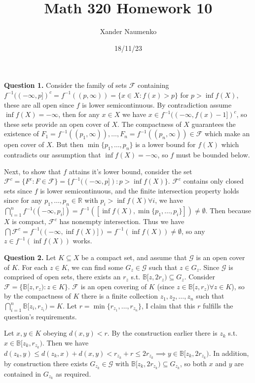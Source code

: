\documentclass[letterpaper, reqno,11pt]{article}
\begin{document}
\title{Math 320 Homework 10}
\date{18/11/23}
\author{Xander Naumenko}
\maketitle

{\medskip\noindent\bf Question 1.} Consider the family of sets $\mathcal F$ containing $f^{-1}((-\infty,p])^{c}=f^{-1}((p,\infty))=\{x\in X:f(x)>p\}$ for $p>\inf f(X)$, these are all open since $f$ is lower semicontinuous. By contradiction assume $\inf f(X)=-\infty$, then for any $x\in X$ we have $x\in f^{-1}((-\infty,f(x)-1])^{c}$, so these sets provide an open cover of $X$. The compactness of $X$ guarantees the existence of $F_1=f^{-1}((p_1,\infty)),\ldots,F_n=f^{-1}((p_n,\infty))\in \mathcal F$ which make an open cover of $X$. But then $\min \{p_1,\ldots,p_n\}$ is a lower bound for $f(X)$ which contradicts our assumption that $\inf f(X)=-\infty$, so $f$ must be bounded below.

Next, to show that $f$ attains it's lower bound, consider the set $\mathcal F^{c}=\{F^{c}:F\in \mathcal F\}=\{f^{-1}((-\infty,p]):p>\inf f(X)\}$. $\mathcal F^{c}$ contains only closed sets since $f$ is lower semicontinuous, and the finite intersection property holds since for any $p_1,\ldots,p_n\in \mathbb{R}$ with $p_i>\inf f(X)\forall i$, we have $\bigcap_{i=1}^{n}f^{-1}((-\infty,p_i])=f^{-1}([\inf f(X),\min \{p_1,\ldots,p_i\}])\neq \emptyset$. Then because $X$ is compact, $\mathcal F^{c}$ has nonempty intersection. Thus we have $\bigcap\mathcal F^{c}= f^{-1}((-\infty,\inf f(X)])=f^{-1}(\inf f(X))\neq \emptyset$, so any $z\in f^{-1}(\inf f(X))$ works.


\newpage\phantom{blabla}
\newpage

{\medskip\noindent\bf Question 2.} Let $K\subseteq X$ be a compact set, and assume that $\mathcal G$ is an open cover of $K$. For each $z\in K$, we can find some $G_z\in \mathcal G$ such that $z\in G_z$. Since $\mathcal G$ is comprised of open sets, there exists an $r_z$ s.t. $\mathbb B[z,2r_z)\subseteq G_z$. Consider $\mathcal F=\{\mathbb B[z,r_z): z\in K\}$. $\mathcal F$ is an open covering of $K$ (since $z\in \mathbb B[z,r_z)\forall z\in K$), so by the compactness of $K$ there is a finite collection $z_1,z_2,\ldots,z_n$ such that $\bigcap_{i=1}^{n}\mathbb B[z_i,r_{z_i})=K$. Let $r=\min \{r_{z_1},\ldots,r_{z_n}\}$, I claim that this $r$ fulfills the question's requirements.

Let $x,y\in K$ obeying $d(x,y)<r$. By the construction earlier there is $z_k$ s.t. $x\in \mathbb B[z_k,r_{z_k})$. Then we have $d(z_k,y)\leq d(z_k,x)+d(x,y)<r_{z_k}+r\leq 2r_{z_k}\implies y\in \mathbb B[z_k,2r_{z_k})$. In addition, by construction there exists $G_{z_k}\in\mathcal G$ with $\mathbb B[z_k,2r_{z_k})\subseteq G_{z_k}$, so both $x$ and $y$ are contained in $G_{z_k}$ as required.
\end{document}
